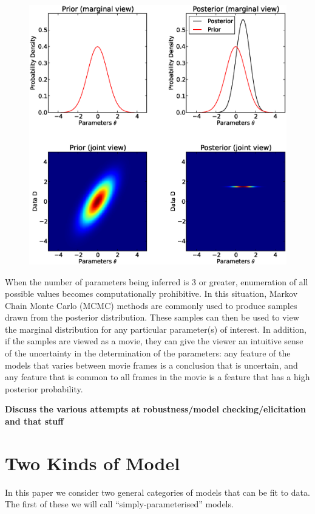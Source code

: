 \documentclass[letterpaper, 11pt]{article}
\begin{document}
\begin{figure}
\begin{center}
\includegraphics[scale=0.5]{joint_marginal.eps}
\end{center}
\end{figure}

When the number of parameters being inferred is 3 or greater, enumeration of
all possible values becomes computationally prohibitive. In this situation,
Markov Chain Monte Carlo (MCMC) methods are commonly used to produce samples
drawn from the posterior distribution. These samples can then be used to view
the marginal distribution for any particular parameter(s) of interest.
In addition, if the
samples are viewed as a movie, they can give the viewer an intuitive sense of
the uncertainty in the determination of the parameters: any feature of the
models that varies between movie frames is a conclusion that is uncertain, and any
feature that is common to all frames in the movie is a feature that has a high
posterior probability.

{\bf Discuss the various attempts at robustness/model checking/elicitation and that stuff}

\section{Two Kinds of Model}
In this paper we consider two general categories of models that can be fit to
data. The first of these we will call ``simply-parameterised'' models.
\end{document}
